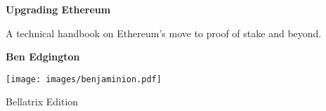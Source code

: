 \begin{titlepage}

   \begin{center}
       \vspace*{1cm}

       \Huge

       \textbf{Upgrading Ethereum}

       \Large

       \vspace{1.0cm}

       A technical handbook on Ethereum's move to proof of stake and beyond.
            
       \vspace{1.0cm}

       \textbf{Ben Edgington}

       \vfill
            
       \texttt{[image: images/benjaminion.pdf]}

       \vfill

       Bellatrix Edition
            
   \end{center}
   \restoregeometry
\end{titlepage}

